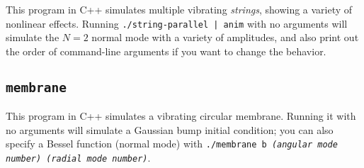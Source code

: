 \documentclass[12pt]{article}
\begin{document}
This program in C++ simulates multiple vibrating {\it strings}, showing a variety
of nonlinear effects. Running {\tt ./string-parallel | anim} with no arguments
will simulate the $N=2$ normal mode with a variety of amplitudes, and also print out
the order of command-line arguments if you want to change the behavior.

\subsection{\tt membrane}

This program in C++ simulates a vibrating circular membrane. Running it with no arguments
will simulate a Gaussian bump initial condition; you can also specify a Bessel function
(normal mode)
with {\tt ./membrane b \it (angular mode number) (radial mode number)}.
\end{document}
